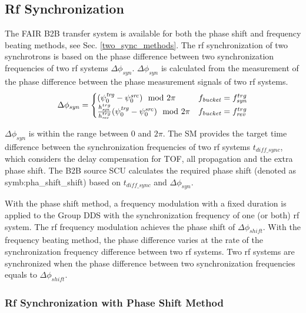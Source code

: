 \subsection{Rf Synchronization}
The FAIR B2B transfer system is available for both the phase shift and frequency beating methods, see Sec. \ref{two_sync_methods}. The rf synchronization of two synchrotrons is based on the phase difference between two synchronization frequencies of two rf systems $\Delta \phi_\mathit{syn}$. $\Delta \phi_\mathit{syn}$ is calculated from the measurement of the phase difference between the phase measurement signals of two rf systems. 
\begin{eqnarray}
\Delta \phi_\mathit{syn}=
\begin{cases}
(\psi^\mathit{trg}_0-\psi^\mathit{src}_0) \mod 2\pi
&f_{\mathit{bucket}}=f_{\mathit{syn}}^{trg}\cr

\frac{h_{\mathit{syn}}^{trg}}{h_{\mathit{rev}}^{trg}}(\psi^\mathit{trg}_0-\psi^\mathit{src}_0) \mod 2\pi
&f_{\mathit{bucket}}=f_{\mathit{rev}}^{trg}
\end{cases}
\end{eqnarray}

$\Delta \phi_\mathit{syn}$ is within the range between $0$ and $2\pi$. The SM provides the target time difference between the synchronization frequencies of two rf systems $t_{\mathit{diff\_sync}}$, which considers the delay compensation for TOF, all propagation and the extra phase shift. The B2B source SCU calculates the required phase shift (denoted as \gls{symb:pha_shift_shift}) based on $t_{\mathit{diff\_sync}}$ and $\Delta \phi_\mathit{syn}$. %

With the phase shift method, a frequency modulation with a fixed duration is applied to the Group DDS with the synchronization frequency of one (or both) rf system. The rf frequency modulation achieves the phase shift of $\Delta \phi_\mathit{shift}$. With the frequency beating method, the phase difference varies at the rate of the synchronization frequency difference between two rf systems. Two rf systems are synchronized when the phase difference between two synchronization frequencies equals to $\Delta \phi_\mathit{shift}$. 

\subsubsection{Rf Synchronization with Phase Shift Method}

